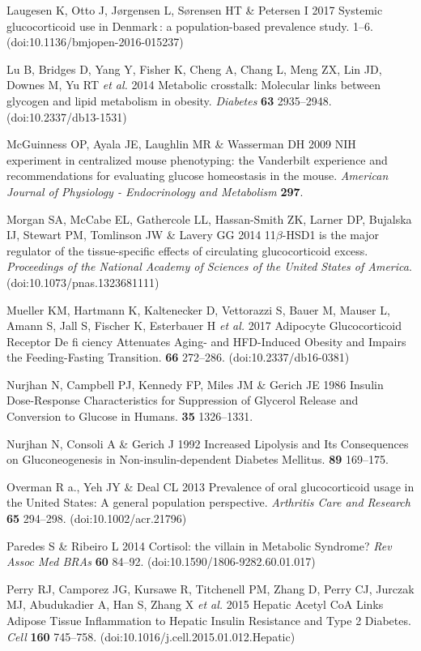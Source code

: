 \documentclass[11pt]{article} %
\begin{document}
Laugesen K, Otto J, Jørgensen L, Sørensen HT \& Petersen I 2017 Systemic
glucocorticoid use in Denmark : a population-based prevalence study.
1--6. (doi:10.1136/bmjopen-2016-015237)

Lu B, Bridges D, Yang Y, Fisher K, Cheng A, Chang L, Meng ZX, Lin JD,
Downes M, Yu RT \emph{et al.} 2014 Metabolic crosstalk: Molecular links
between glycogen and lipid metabolism in obesity. \emph{Diabetes}
\textbf{63} 2935--2948. (doi:10.2337/db13-1531)

McGuinness OP, Ayala JE, Laughlin MR \& Wasserman DH 2009 NIH experiment
in centralized mouse phenotyping: the Vanderbilt experience and
recommendations for evaluating glucose homeostasis in the mouse.
\emph{American Journal of Physiology - Endocrinology and Metabolism}
\textbf{297}.

Morgan SA, McCabe EL, Gathercole LL, Hassan-Smith ZK, Larner DP,
Bujalska IJ, Stewart PM, Tomlinson JW \& Lavery GG 2014 11$\beta$-HSD1 is the
major regulator of the tissue-specific effects of circulating
glucocorticoid excess. \emph{Proceedings of the National Academy of
Sciences of the United States of America}. (doi:10.1073/pnas.1323681111)

Mueller KM, Hartmann K, Kaltenecker D, Vettorazzi S, Bauer M, Mauser L,
Amann S, Jall S, Fischer K, Esterbauer H \emph{et al.} 2017 Adipocyte
Glucocorticoid Receptor De fi ciency Attenuates Aging- and HFD-Induced
Obesity and Impairs the Feeding-Fasting Transition. \textbf{66}
272--286. (doi:10.2337/db16-0381)

Nurjhan N, Campbell PJ, Kennedy FP, Miles JM \& Gerich JE 1986 Insulin
Dose-Response Characteristics for Suppression of Glycerol Release and
Conversion to Glucose in Humans. \textbf{35} 1326--1331.

Nurjhan N, Consoli A \& Gerich J 1992 Increased Lipolysis and Its
Consequences on Gluconeogenesis in Non-insulin-dependent Diabetes
Mellitus. \textbf{89} 169--175.

Overman R a., Yeh JY \& Deal CL 2013 Prevalence of oral glucocorticoid
usage in the United States: A general population perspective.
\emph{Arthritis Care and Research} \textbf{65} 294--298.
(doi:10.1002/acr.21796)

Paredes S \& Ribeiro L 2014 Cortisol: the villain in Metabolic Syndrome?
\emph{Rev Assoc Med BRAs} \textbf{60} 84--92.
(doi:10.1590/1806-9282.60.01.017)

Perry RJ, Camporez JG, Kursawe R, Titchenell PM, Zhang D, Perry CJ,
Jurczak MJ, Abudukadier A, Han S, Zhang X \emph{et al.} 2015 Hepatic
Acetyl CoA Links Adipose Tissue Inflammation to Hepatic Insulin
Resistance and Type 2 Diabetes. \emph{Cell} \textbf{160} 745--758.
(doi:10.1016/j.cell.2015.01.012.Hepatic)
\end{document}
